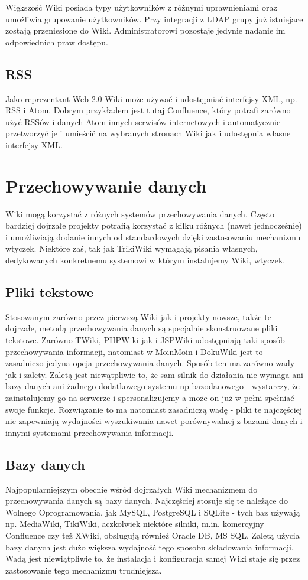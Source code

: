 \documentclass{article}
\begin{document}
Większość Wiki posiada typy użytkowników z różnymi uprawnieniami oraz umożliwia grupowanie użytkowników. Przy integracji z LDAP grupy już istniejace zostają przeniesione do Wiki. Administratorowi pozostaje jedynie nadanie im odpowiednich praw dostępu.

	\subsection{RSS}
	Jako reprezentant Web 2.0 Wiki może używać i udostępniać interfejsy XML, np. RSS i Atom. Dobrym przykładem jest tutaj Confluence, który potrafi zarówno użyć RSSów i danych Atom innych serwisów internetowych i automatycznie przetworzyć je i umieścić na wybranych stronach Wiki jak i udostępnia własne interfejsy XML.  
\newpage
\section{Przechowywanie danych}
	Wiki mogą korzystać z różnych systemów przechowywania danych. Często bardziej dojrzałe projekty potrafią korzystać z kilku różnych (nawet jednocześnie) i umożliwiają dodanie innych od standardowych dzięki zastosowaniu mechanizmu wtyczek. Niektóre zaś, tak jak TrikiWiki wymagają pisania własnych, dedykowanych konkretnemu systemowi w którym instalujemy Wiki, wtyczek. 
	\subsection{Pliki tekstowe}
	Stosowanym zarówno przez pierwszą Wiki jak i projekty nowsze, także te dojrzałe, metodą przechowywania danych są specjalnie skonstruowane pliki tekstowe. Zarówno TWiki, PHPWiki jak i JSPWiki udostępniają taki sposób przechowywania informacji, natomiast w MoinMoin i DokuWiki jest to zasadniczo jedyna opcja przechowywania danych. Sposób ten ma zarówno wady jak i zalety. Zaletą jest niewątpliwie to, że sam silnik do działania nie wymaga ani bazy danych ani żadnego dodatkowego systemu np bazodanowego - wystarczy, że zainstalujemy go na serwerze i spersonalizujemy a może on już w pełni spełniać swoje funkcje. Rozwiązanie to ma natomiast zasadniczą wadę - pliki te najczęściej nie zapewniają wydajności wyszukiwania nawet porównywalnej z bazami danych i innymi systemami przechowywania informacji. 
	\subsection{Bazy danych}
	Najpopularniejszym obecnie wśród dojrzałych Wiki mechanizmem do przechowywania danych są bazy danych. Najczęściej stosuje się te należące do Wolnego Oprogramowania, jak MySQL, PostgreSQL i SQLite - tych baz używają np. MediaWiki, TikiWiki, aczkolwiek niektóre silniki, m.in. komercyjny Confluence czy też XWiki, obsługują również Oracle DB, MS SQL. Zaletą użycia bazy danych jest dużo większa wydajność tego sposobu składowania informacji. Wadą jest niewiątpliwie to, że instalacja i konfiguracja samej Wiki staje się przez zastosowanie tego mechanizmu trudniejsza.
\end{document}
